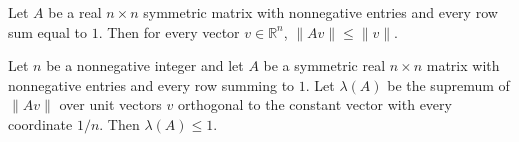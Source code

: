 \begin{theorem}
\label{Expander.norm_toCLM_apply_le}
\leanok
{}
Let $A$ be a real $n\times n$ symmetric matrix with nonnegative entries and every row
sum equal to $1$. Then for every vector $v\in\mathbb R^n$, $\|Av\|\le\|v\|$.
\end{theorem}

\begin{theorem}
\label{Expander.lambda_le_one}
\leanok
{}
Let $n$ be a nonnegative integer and let $A$ be a symmetric real $n\times n$ matrix with
nonnegative entries and every row summing to $1$. Let $\lambda(A)$ be the supremum of
$\|Av\|$ over unit vectors $v$ orthogonal to the constant vector with every coordinate
$1/n$. Then $\lambda(A)\leq 1$.
\end{theorem}
